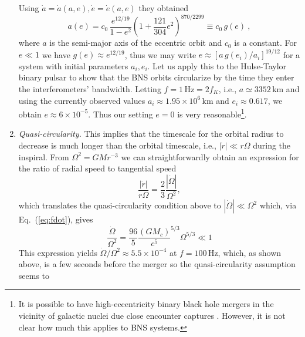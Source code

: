 \documentclass[prd,amsmath,amssymb,aps,floats,amsfonts,notitlepage,superscriptaddress,eqsecnum,nofootinbib,10pt]{revtex4-1}
\newcommand{\f}{\frac}
\newcommand{\be}{\begin{equation}}
\newcommand{\ee}{\end{equation}}
\begin{document}
\begin{enumerate}
Using $\dot{a}=\dot{a}(a,e), \dot{e}=\dot{e}(a,e)$ they obtained
%
\be
a(e) = c_0\, \f{e^{12/19}}{1-e^2}\left(1 + \f{121}{304}e^2\right)^{870/2299} \equiv c_0\, g(e) \ , \label{eq:a_of_e}
\ee
%
where $a$ is the semi-major axis of the eccentric orbit and $c_0$ is a constant. For $e\ll 1$ we have $g(e)\approx e^{12/19}$, thus we may write $e\approx [a\, g(e_i)/a_i ]^{19/12}$ 
for a system with initial parameters $a_i, e_i$.
Let us apply this to the Hulse-Taylor binary pulsar \cite{Hulse:1974eb,Weisberg:2010zz} to show that the BNS orbits circularize by the time they enter the interferometers' bandwidth.
Letting $f = 1\,\text{Hz}=2f_K$, i.e., 
$a \simeq 3352\,$km and using the currently observed values $a_i \approx 1.95\times 10^6\,$km and $e_i \approx 0.617$,
we obtain $e\approx 6\times 10^{-5}$. Thus our setting $e=0$ is very reasonable\footnote{
It is possible to have 
high-eccentricity binary black hole mergers in the vicinity of galactic nuclei due close encounter captures \cite{OLeary:2008myb}.
However, it is not clear how much this applies to BNS systems.}.
%
%
\item {\it Quasi-circularity.}
This implies that the timescale for the orbital radius to decrease is much longer than the orbital timescale, i.e., 
$|\dot{r}|\ll r\Omega$ during the inspiral. From $\Omega^2 = GM r^{-3}$ we can straightforwardly obtain 
%
%
an expression for the ratio of radial speed to tangential speed
%
\be
\f{|\dot{r}|}{r\Omega}=\f{2}{3}\f{|\dot\Omega|}{\Omega^2} \label{eq:ratio_of_radial_vel_to_tang_vel} ,
\ee
%
which translates the quasi-circularity condition above to $|\dot\Omega| \ll \Omega^2$ which, via Eq.~(\ref{eq:fdot}), gives
%
\be
\f{\dot\Omega}{\Omega^2} = \f{96}{5} \f{(G M_c)}{c^5}^{5/3}\Omega^{5/3} \ll 1 \label{eq:omega_dot_over_omegasq}
\ee
%
This expression yields $\dot{\Omega}/\Omega^2\approx 5.5\times 10^{-4}$ at $f=100\,$Hz, which, as shown above, is a few seconds
before the merger so the quasi-circularity assumption seems to

\end{enumerate}
\end{document}
